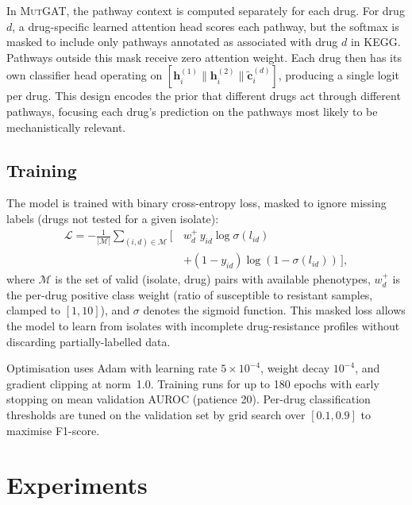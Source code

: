 \documentclass{article}
\theoremstyle{plain}
\theoremstyle{definition}
\theoremstyle{remark}
\begin{document}
In \textsc{MutGAT}, the pathway context is computed separately for each drug. For drug $d$, a drug-specific learned attention head scores each pathway, but the softmax is masked to include only pathways annotated as associated with drug $d$ in KEGG. Pathways outside this mask receive zero attention weight. Each drug then has its own classifier head operating on $[\mathbf{h}_i^{(1)} \| \mathbf{h}_i^{(2)} \| \tilde{\mathbf{c}}_i^{(d)}]$, producing a single logit per drug. This design encodes the prior that different drugs act through different pathways, focusing each drug's prediction on the pathways most likely to be mechanistically relevant.

\subsection{Training}
\label{sec:training}

The model is trained with binary cross-entropy loss, masked to ignore missing labels (drugs not tested for a given isolate):
\begin{equation}
\begin{split}
    \mathcal{L} = -\frac{1}{|\mathcal{M}|} \sum_{(i,d) \in \mathcal{M}}
        \bigl[\, &w_d^+ \, y_{id} \log \sigma(l_{id}) \\
        &+ (1 - y_{id}) \log(1 - \sigma(l_{id})) \,\bigr],
\end{split}
\label{eq:loss}
\end{equation}
where $\mathcal{M}$ is the set of valid (isolate, drug) pairs with available phenotypes, $w_d^+$ is the per-drug positive class weight (ratio of susceptible to resistant samples, clamped to $[1, 10]$), and $\sigma$ denotes the sigmoid function. This masked loss allows the model to learn from isolates with incomplete drug-resistance profiles without discarding partially-labelled data.

Optimisation uses Adam with learning rate $5 \times 10^{-4}$, weight decay $10^{-4}$, and gradient clipping at norm~1.0. Training runs for up to 180 epochs with early stopping on mean validation AUROC (patience 20). Per-drug classification thresholds are tuned on the validation set by grid search over $[0.1, 0.9]$ to maximise F1-score.


\section{Experiments}
\label{sec:experiments}
\end{document}
